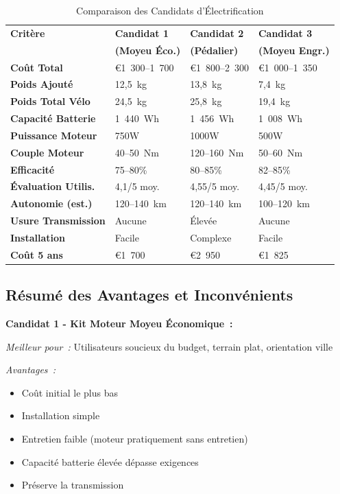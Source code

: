 \documentclass[12pt,a4paper]{article}
\begin{document}
\begin{table}[htbp]
\centering
\caption{Comparaison des Candidats d'Électrification}
\label{tab:comparison}
\small
\begin{tabular}{@{}llll@{}}
\toprule
\textbf{Critère} & \textbf{Candidat 1} & \textbf{Candidat 2} & \textbf{Candidat 3} \\
                   & \textbf{(Moyeu Éco.)} & \textbf{(Pédalier)} & \textbf{(Moyeu Engr.)} \\ \midrule
\textbf{Coût Total} & €1~300--1~700 & €1~800--2~300 & €1~000--1~350 \\
\textbf{Poids Ajouté} & 12,5~kg & 13,8~kg & 7,4~kg \\
\textbf{Poids Total Vélo} & 24,5~kg & 25,8~kg & 19,4~kg \\
\textbf{Capacité Batterie} & 1~440~Wh & 1~456~Wh & 1~008~Wh \\
\textbf{Puissance Moteur} & 750W & 1000W & 500W \\
\textbf{Couple Moteur} & 40--50~Nm & 120--160~Nm & 50--60~Nm \\
\textbf{Efficacité} & 75--80\% & 80--85\% & 82--85\% \\
\textbf{Évaluation Utilis.} & 4,1/5 moy. & 4,55/5 moy. & 4,45/5 moy. \\
\textbf{Autonomie (est.)} & 120--140~km & 120--140~km & 100--120~km \\
\textbf{Usure Transmission} & Aucune & Élevée & Aucune \\
\textbf{Installation} & Facile & Complexe & Facile \\
\textbf{Coût 5 ans} & €1~700 & €2~950 & €1~825 \\ \bottomrule
\end{tabular}
\end{table}

\subsection{Résumé des Avantages et Inconvénients}

\textbf{Candidat 1 - Kit Moteur Moyeu Économique~:}

\textit{Meilleur pour~:} Utilisateurs soucieux du budget, terrain plat, orientation ville

\textit{Avantages~:}
\begin{itemize}
    \item Coût initial le plus bas
    \item Installation simple
    \item Entretien faible (moteur pratiquement sans entretien)
    \item Capacité batterie élevée dépasse exigences
    \item Préserve la transmission
\end{itemize}
\end{document}
